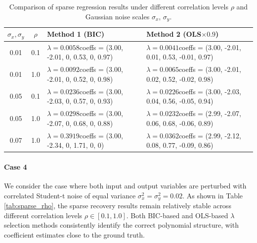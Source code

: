 \begin{table}[htbp]
\centering
\caption{Comparison of sparse regression results under different correlation levels $\rho$ and Gaussian noise scales $\sigma_x$, $\sigma_y$.}
\label{tab:cor}
\scriptsize
\begin{tabular}{c c p{6cm} p{6cm}}
\toprule
$\sigma_x,\sigma_y$ & $\rho$ & Method 1 (BIC) & Method 2 (OLS$\times 0.9$) \\
\midrule
0.01 & 0.1 
& $\lambda=0.0058$\newline coeffs = (3.00, -2.01, 0, 0.53, 0, 0.97) 
& $\lambda=0.0041$\newline coeffs = (3.00, -2.01, 0.01, 0.53, -0.01, 0.97) \\
\midrule
0.01 & 1.0 
& $\lambda=0.0092$\newline coeffs = (3.00, -2.01, 0, 0.52, 0, 0.98) 
& $\lambda=0.0065$\newline coeffs = (3.00, -2.01, 0.02, 0.52, -0.02, 0.98) \\
\midrule
0.05 & 0.1 
& $\lambda=0.0236$\newline coeffs = (3.00, -2.03, 0, 0.57, 0, 0.93) 
& $\lambda=0.0226$\newline coeffs = (3.00, -2.03, 0.04, 0.56, -0.05, 0.94) \\
\midrule
0.05 & 1.0 
& $\lambda=0.0298$\newline coeffs = (3.00, -2.07, 0, 0.68, 0, 0.88) 
& $\lambda=0.0232$\newline coeffs = (2.99, -2.07, 0.06, 0.68, -0.06, 0.89) \\
\midrule
0.07 & 1.0 
& $\lambda=0.3919$\newline coeffs = (3.00, -2.34, 0, 1.71, 0, 0) 
& $\lambda=0.0362$\newline coeffs = (2.99, -2.12, 0.08, 0.77, -0.09, 0.86) \\
\bottomrule
\end{tabular}
\end{table}




\paragraph{Case 4}

We consider the case where both input and output variables are perturbed with correlated Student-t noise of equal variance $\sigma_x^2 = \sigma_y^2 = 0.02$. As shown in Table \ref{tab:sparse_rho}, the sparse recovery results remain relatively stable across different correlation levels $\rho \in [0.1, 1.0]$. Both BIC-based and OLS-based $\lambda$ selection methods consistently identify the correct polynomial structure, with coefficient estimates close to the ground truth. 


